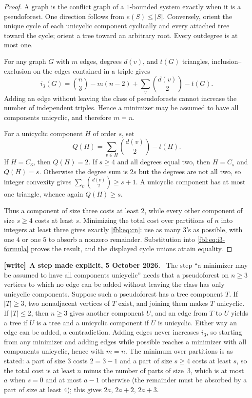 \documentclass[11pt]{article}
\theoremstyle{definition}
\theoremstyle{remark}
\newenvironment{writenote}[1][]{\par\smallskip\begingroup\small
 \noindent\textbf{[write]}\if\relax\detokenize{#1}\relax\else~\textbf{#1.}\fi\ }%
 {\par\endgroup\smallskip}
\begin{document}
\begin{proof}
A graph is the conflict graph of a $1$-bounded system exactly when it is a
pseudoforest.  One direction follows from
$e(S)\le|S|$.  Conversely, orient the unique cycle of each unicyclic
component cyclically and every attached tree toward the cycle; orient a tree
toward an arbitrary root.  Every outdegree is at most one.

For any graph $G$ with $m$ edges, degrees $d(v)$, and $t(G)$ triangles,
inclusion--exclusion on the edges contained in a triple gives
\begin{equation}\label{fbl:eq:i3-formula}
 i_3(G)
 =\binom n3-m(n-2)
   +\sum_v\binom{d(v)}2-t(G).
\end{equation}
Adding an edge without leaving the class of pseudoforests cannot increase
the number of independent triples.  Hence a minimizer may be assumed to have
all components unicyclic, and therefore $m=n$.

For a unicyclic component $H$ of order $s$, set
\[
 Q(H)=\sum_{v\in H}\binom{d(v)}2-t(H).
\]
If $H=C_3$, then $Q(H)=2$.  If $s\ge4$ and all degrees equal two, then
$H=C_s$ and $Q(H)=s$.  Otherwise the degree sum is $2s$ but the degrees are
not all two, so integer convexity gives
$\sum_v\binom{d(v)}2\ge s+1$.  A unicyclic component has at most one
triangle, whence again $Q(H)\ge s$.

Thus a component of size three costs at least $2$, while every other
component of size $s\ge4$ costs at least $s$.  Minimizing the total cost over
partitions of $n$ into integers at least three gives exactly
\cref{fbl:eq:cn}: use as many $3$'s as possible, with one $4$ or one $5$ to
absorb a nonzero remainder.  Substitution into \cref{fbl:eq:i3-formula} proves
the result, and the displayed cycle unions attain equality.
\end{proof}

\begin{writenote}[A step made explicit, 5 October 2026]
The step ``a minimizer may be assumed to have all components unicyclic''
needs that a pseudoforest on $n\ge3$ vertices to which no edge can be added
without leaving the class has only unicyclic components. Suppose such a
pseudoforest has a tree component $T$. If $\lvert T\rvert\ge3$, two
nonadjacent vertices of $T$ exist, and joining them makes $T$ unicyclic. If
$\lvert T\rvert\le2$, then $n\ge3$ gives another component $U$, and an edge
from $T$ to $U$ yields a tree if $U$ is a tree and a unicyclic component if
$U$ is unicyclic. Either way an edge can be added, a contradiction. Adding
edges never increases $i_3$, so starting from any minimizer and adding
edges while possible reaches a minimizer with all components unicyclic,
hence with $m=n$. The minimum over partitions is as stated: a part of size
$3$ costs $2=3-1$ and a part of size $s\ge4$ costs at least $s$, so the
total cost is at least $n$ minus the number of parts of size~$3$, which is
at most $a$ when $s=0$ and at most $a-1$ otherwise (the remainder must be
absorbed by a part of size at least $4$); this gives $2a$, $2a+2$, $2a+3$.
\end{writenote}
\end{document}
